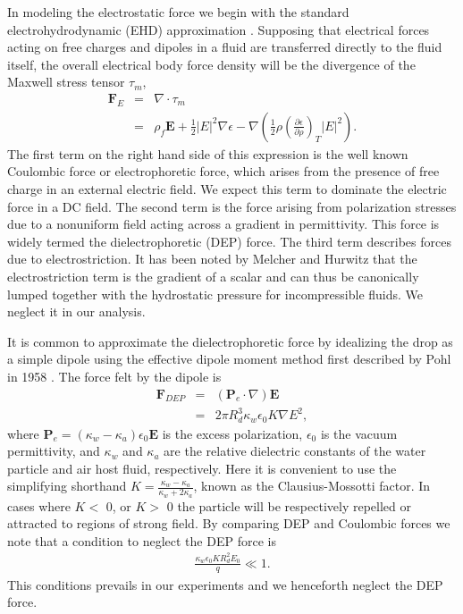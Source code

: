\documentclass[aip,reprint, floatfix]{revtex4-1}
\begin{document}
In modeling the electrostatic force we begin with the standard electrohydrodynamic (EHD) approximation \cite{saville_electrohydrodynamics:_1997}. Supposing that electrical forces acting on free charges and dipoles in a fluid are transferred directly to the fluid itself, the overall electrical body force density will be the divergence of the Maxwell stress tensor $\tau_m $,
\begin{eqnarray} \label{e_force}
 \mathbf{F}_E &=& \nabla \cdot \tau_m \nonumber \\ 
 &=& \rho_f \mathbf{E} + \frac{1}{2} \left| E \right|^2 \nabla \epsilon - \nabla \left( \frac{1}{2} \rho \left( \frac{\partial \epsilon}{\partial \rho} \right)_T \left| E \right|^2 \right) .
\end{eqnarray}
The first term on the right hand side of this expression is the well known Coulombic force or electrophoretic force, which arises from the presence of free charge in an external electric field. We expect this term to dominate the electric force in a DC field. The second term is the force arising from polarization stresses due to a nonuniform field acting across a gradient in permittivity. This force is widely termed the dielectrophoretic (DEP) force. The third term describes forces due to electrostriction. It has been noted by Melcher and Hurwitz \cite{hurwitz_electrohydrodynamic_1966} that the electrostriction term is the gradient of a scalar and can thus be canonically lumped together with the hydrostatic pressure for incompressible fluids. We neglect it in our analysis. 

It is common to approximate the dielectrophoretic force by idealizing the drop as a simple dipole using the effective dipole moment method first described by Pohl in 1958 \cite{pohl_effects_1958}. The force felt by the dipole is 
\begin{eqnarray} \label{dep_force}
\mathbf{F}_{DEP} &=& \left( \mathbf{P}_e \cdot \nabla \right) \mathbf{E} \nonumber \\
&=& 2 \pi R_d^3 \kappa_w \epsilon_0 K \nabla E^2,
\end{eqnarray}
where $\mathbf{P}_e=(\kappa_w - \kappa_a)\epsilon_0 \mathbf{E}$ is the excess polarization, $\epsilon_0$ is the vacuum permittivity, and $\kappa_w$ and $\kappa_a$ are the relative dielectric constants of the water particle and air host fluid, respectively. Here it is convenient to use the simplifying shorthand $K = \frac{\kappa_w - \kappa_a}{\kappa_w + 2 \kappa_a}$, known as the Clausius-Mossotti factor. In cases where $K <$ 0, or $K>$ 0 the particle will be respectively repelled or attracted to regions of strong field. By comparing DEP and Coulombic forces we note that a condition to neglect the DEP force is
\begin{eqnarray}
\frac{ \kappa_w \epsilon_0 K R_d^2 E_0}{q} \ll 1. \nonumber
\end{eqnarray}
This conditions prevails in our experiments and we henceforth neglect the DEP force. 
\end{document}
